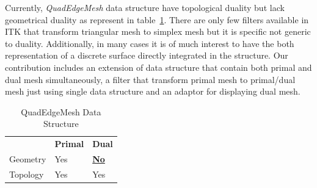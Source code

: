 \documentclass{InsightArticle}
\begin{document}
Currently, \emph{QuadEdgeMesh} data structure have topological duality but lack geometrical duality as represent in table~\ref{table:existingStructure}. There are only few filters available in ITK that transform triangular mesh to simplex mesh but it is specific not generic to duality. Additionally, in many cases it is of much interest to have the both representation of a discrete surface directly integrated in the structure. Our contribution includes an extension of data structure that contain both primal and dual mesh simultaneously, a filter that transform primal mesh to primal/dual mesh just using single data structure and an adaptor for displaying dual mesh.
\begin{table}
	\begin{center}
		\caption{QuadEdgeMesh Data Structure}
		\label{table:existingStructure}
		\begin{tabular}{ p{3cm} p{3cm} p{3cm} }
			\hline	
			\noalign{\smallskip} 
			{\bf  }	& {\bf Primal} & {\bf Dual} \\
			\noalign{\smallskip}	
			\hline  	
			\noalign{\smallskip}
			Geometry & Yes & \textbf{\underline{No}} \\ 
			Topology & Yes & Yes \\ 
			\hline
	\end{tabular}
	\end{center}
\end{table}
\end{document}
